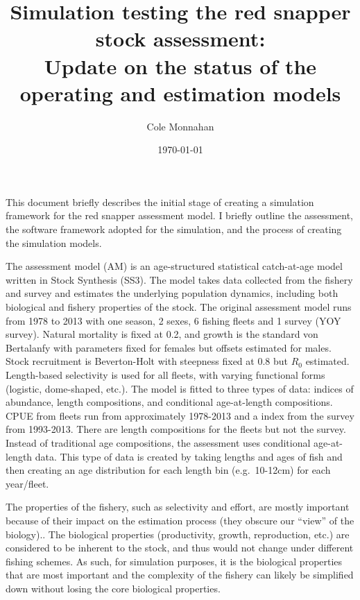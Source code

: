 \documentclass{article}
\begin{document}
\title{Simulation testing the red snapper stock assessment:\\ Update on the
  status of the operating and estimation models}
\author{Cole Monnahan}
\date{\today{}}
\maketitle

This document briefly describes the initial stage of creating a simulation
framework for the red snapper assessment model. I briefly outline the
assessment, the software framework adopted for the simulation, and the
process of creating the simulation models.

The assessment model (AM) is an age-structured statistical catch-at-age
model written in Stock Synthesis (SS3). The model takes data collected from
the fishery and survey and estimates the underlying population dynamics,
including both biological and fishery properties of the stock. The original
assessment model runs from 1978 to 2013 with one season, 2 sexes, 6 fishing
fleets and 1 survey (YOY survey). Natural mortality is fixed at 0.2, and
growth is the standard von Bertalanfy with parameters fixed for females but
offsets estimated for males. Stock recruitment is Beverton-Holt with
steepness fixed at 0.8 but $R_0$ estimated. Length-based selectivity is
used for all fleets, with varying functional forms (logistic, dome-shaped,
etc.). The model is fitted to three types of data: indices of abundance,
length compositions, and conditional age-at-length compositions. CPUE from
fleets run from approximately 1978-2013 and a index from the survey from
1993-2013. There are length compositions for the fleets but not the
survey. Instead of traditional age compositions, the assessment uses
conditional age-at-length data. This type of data is created by taking
lengths and ages of fish and then creating an age distribution for each
length bin (e.g.\ 10-12cm) for each year/fleet.

The properties of the fishery, such as selectivity and effort, are mostly
important because of their impact on the estimation process (they obscure
our ``view'' of the biology).. The biological properties (productivity,
growth, reproduction, etc.) are considered to be inherent to the stock, and
thus would not change under different fishing schemes. As such, for
simulation purposes, it is the biological properties that are most
important and the complexity of the fishery can likely be simplified down
without losing the core biological properties.
\end{document}
